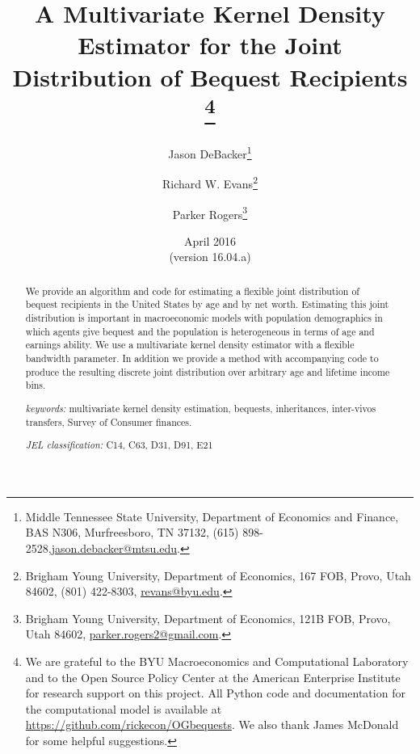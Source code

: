 \documentclass[letterpaper,12pt]{article}
\theoremstyle{definition}
\begin{document}
\begin{titlepage}
\title{A Multivariate Kernel Density Estimator for the Joint Distribution of Bequest Recipients
       \thanks{
       We are grateful to the BYU Macroeconomics and Computational Laboratory and to the Open Source Policy Center at the American Enterprise Institute for research support on this project. All Python code and documentation for the computational model is available at \href{https://github.com/rickecon/OGbequests}{https://github.com/rickecon/OGbequests}. We also thank James McDonald for some helpful suggestions.}
       }
\author{
  Jason DeBacker\footnote{Middle Tennessee State University, Department of Economics and Finance, BAS N306, Murfreesboro, TN 37132, (615) 898-2528,\href{mailto:jason.debacker@mtsu.edu}{jason.debacker@mtsu.edu}.} \\[-2pt]
  \and
  Richard W. Evans\footnote{Brigham Young University, Department of Economics, 167 FOB, Provo, Utah 84602, (801) 422-8303, \href{mailto:revans@byu.edu}{revans@byu.edu}.} \\[-2pt]
  \and
  Parker Rogers\footnote{Brigham Young University, Department of Economics, 121B FOB, Provo, Utah 84602, \href{mailto:parker.rogers2@gmail.com}{parker.rogers2@gmail.com}.} \\[-2pt]}
\date{April 2016 \\
  \scriptsize{(version 16.04.a)}}
\maketitle
\vspace{-9mm}
\begin{abstract}
\small{We provide an algorithm and code for estimating a flexible joint distribution of bequest recipients in the United States by age and by net worth. Estimating this joint distribution is important in macroeconomic models with population demographics in which agents give bequest and the population is heterogeneous in terms of age and earnings ability. We use a multivariate kernel density estimator with a flexible bandwidth parameter. In addition we provide a method with accompanying code to produce the resulting discrete joint distribution over arbitrary age and lifetime income bins.

\vspace{3mm}

\noindent\textit{keywords:}\: multivariate kernel density estimation, bequests, inheritances, inter-vivos transfers, Survey of Consumer finances.

\vspace{3mm}

\noindent\textit{JEL classification:} C14, C63, D31, D91, E21}
\end{abstract}
\thispagestyle{empty}
\end{titlepage}
\end{document}
